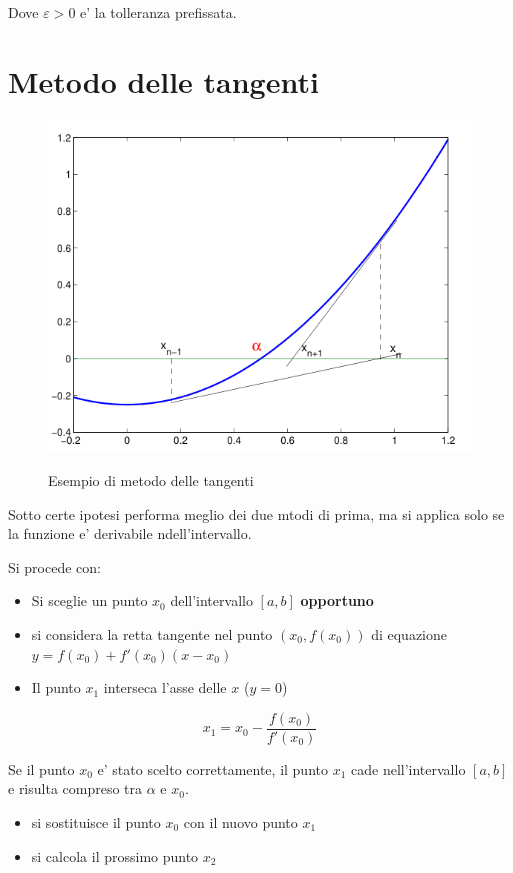 Dove $\varepsilon > 0$ e' la tolleranza prefissata.


\section{Metodo delle tangenti}
\begin{figure}[h!]
  \centering
  \includegraphics[width=0.5\linewidth]{./images/tangenti.png}
  \label{fig:tangenti}
  \caption{Esempio di metodo delle tangenti}
\end{figure}
Sotto certe ipotesi performa meglio dei due mtodi di prima, ma si applica solo se la funzione
e' derivabile ndell'intervallo.

Si procede con:
\begin{itemize}
  \item Si sceglie un punto $x_0$ dell'intervallo $[a, b]$ \textbf{opportuno}
  \item si considera la retta tangente nel punto $(x_0, f(x_0))$ di equazione $y = f(x_0) + f'(x_0)(x-x_0)$
  \item Il punto $x_1$ interseca l'asse delle $x$ ($y=0$)
\end{itemize}

\begin{equation}
  x_1 = x_0 - \frac{f(x_0)}{f'(x_0)}
\end{equation}

Se il punto $x_0$ e' stato scelto correttamente, il punto $x_1$ cade nell'intervallo $[a, b]$
e risulta compreso tra $\alpha$ e $x_0$.

\begin{itemize}
  \item si sostituisce il punto $x_0$ con il nuovo punto $x_1$
  \item si calcola il prossimo punto $x_2$
\end{itemize}


